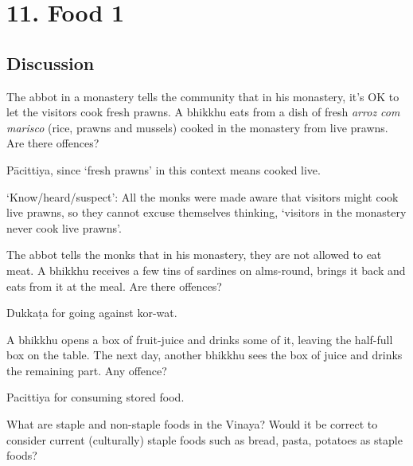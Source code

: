 \chapter{11. Food 1}
\renewcommand*{\theChapterTitle}{11. Food 1}

\section*{Discussion}

The abbot in a monastery tells the community that in his monastery, it's OK to let the visitors cook fresh prawns.
A bhikkhu eats from a dish of fresh \emph{arroz com marisco} (rice, prawns and mussels) cooked in the monastery from live prawns.
Are there offences?

\begin{solution}
  Pācittiya, since `fresh prawns' in this context means cooked live.

  `Know/heard/suspect': All the monks were made aware that visitors might cook live prawns,
  so they cannot excuse themselves thinking, `visitors in the monastery never cook live prawns'.
\end{solution}

\bigskip
    
The abbot tells the monks that in his monastery, they are not allowed to eat meat.
A bhikkhu receives a few tins of sardines on alms-round, brings it back and eats from it at the meal.
Are there offences?

\begin{solution}
  Dukkaṭa for going against kor-wat.
\end{solution}

\bigskip

A bhikkhu opens a box of fruit-juice and drinks some of it, leaving the
half-full box on the table. The next day, another bhikkhu sees the box of juice
and drinks the remaining part. Any offence?

\begin{solution}
  Pacittiya for consuming stored food.
\end{solution}

\bigskip


What are staple and non-staple foods in the Vinaya?
Would it be correct to consider current (culturally) staple foods such as bread, pasta, potatoes as staple foods?

